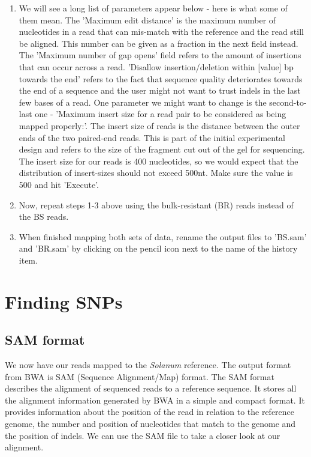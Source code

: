 \documentclass[12pt,a4paper]{article}
\begin{document}
\begin{enumerate}
	\item We will see a long list of parameters appear below -
          here is what some of them mean. The 'Maximum edit distance'
          is the maximum number of nucleotides in a read that can
          mis-match with the reference and the read still be
          aligned. This number can be given as a fraction in the next
          field instead. The 'Maximum number of gap opens' field
          refers to the amount of insertions that can occur across a
          read. 'Disallow insertion/deletion within [value] bp towards
          the end' refers to the fact that sequence quality
          deteriorates towards the end of a sequence and the user
          might not want to trust indels in the last few bases of a
          read. One parameter we might want to change is the
          second-to-last one - 'Maximum insert size for a read pair to
          be considered as being mapped properly:'. The insert size of
          reads is the distance between the outer ends of the two
          paired-end reads. This is part of the initial experimental
          design and refers to the size of the fragment cut out of the
          gel for sequencing. The insert size for our reads is 400
          nucleotides, so we would expect that the distribution of
          insert-sizes should not exceed 500nt. Make sure the value is
          500 and hit 'Execute'.
	\item Now, repeat steps 1-3 above using the bulk-resistant
          (BR) reads instead of the BS reads.
	\item When finished mapping both sets of data, rename the
          output files to 'BS.sam' and 'BR.sam' by clicking on the
          pencil icon next to the name of the history item.
\end{enumerate}

\section{Finding SNPs}

\subsection{SAM format}

We now have our reads mapped to the \emph{Solanum} reference. The
output format from BWA is SAM (Sequence Alignment/Map) format. The SAM
format describes the alignment of sequenced reads to a reference
sequence. It stores all the alignment information generated by BWA in
a simple and compact format. It provides information about the
position of the read in relation to the reference genome, the number
and position of nucleotides that match to the genome and the position
of indels. We can use the SAM file to take a closer look at our
alignment.\\
\end{document}
